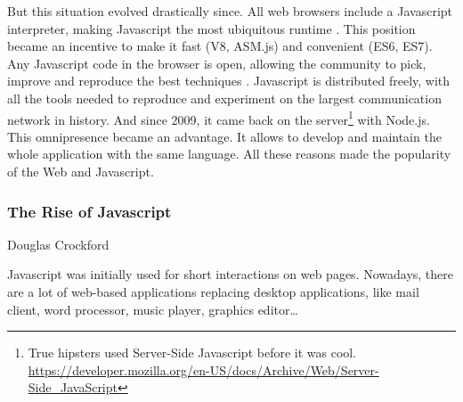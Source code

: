 But this situation evolved drastically since.
All web browsers include a Javascript interpreter, making Javascript the most ubiquitous runtime \cite{Flanagan2006}.
This position became an incentive to make it fast (V8, ASM.js) and convenient (ES6, ES7).
Any Javascript code in the browser is open, allowing the community to pick, improve and reproduce the best techniques .
Javascript is distributed freely, with all the tools needed to reproduce and experiment on the largest communication network in history.
And since 2009, it came back on the server\footnote{True hipsters used Server-Side Javascript before it was cool. \url{https://developer.mozilla.org/en-US/docs/Archive/Web/Server-Side_JavaScript}} with Node.js.
This omnipresence became an advantage.
It allows to develop and maintain the whole application with the same language.
All these reasons made the popularity of the Web and Javascript.



\subsubsection{The Rise of Javascript}

%
{Douglas Crockford}

Javascript was initially used for short interactions on web pages.
Nowadays, there are a lot of web-based applications replacing desktop applications, like mail client, word processor, music player, graphics editor\ldots

